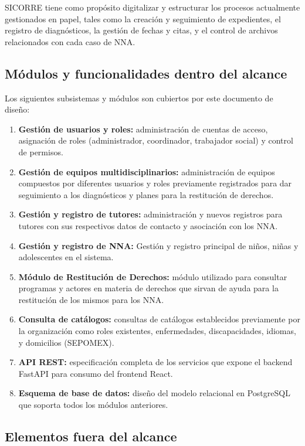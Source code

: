 SICORRE tiene como propósito digitalizar y estructurar los procesos actualmente gestionados
en papel, tales como la creación y seguimiento de expedientes, el registro de diagnósticos,
la gestión de fechas y citas, y el control de archivos relacionados con cada caso de NNA.

\subsection*{Módulos y funcionalidades dentro del alcance}

Los siguientes subsistemas y módulos son cubiertos por este documento de diseño:

\begin{enumerate}
	\item \textbf{Gestión de usuarios y roles:} administración de cuentas de acceso,
	asignación de roles (administrador, coordinador, trabajador social) y control
	de permisos.
	\item \textbf{Gestión de equipos multidisciplinarios:} administración de equipos compuestos
	por diferentes usuarios y roles previamente registrados para dar seguimiento a los diagnósticos y
	planes para la restitución de derechos.
	\item \textbf{Gestión y registro de tutores:} administración y nuevos registros para tutores 
	con sus respectivos datos de contacto y asociación con los NNA.
	\item \textbf{Gestión y registro de NNA:} Gestión y registro principal de niños, niñas y 
	adolescentes en el sistema.
	\item \textbf{Módulo de Restitución de Derechos:} módulo utilizado para consultar programas y actores en 
	materia de derechos que sirvan de ayuda para la restitución de los mismos para los NNA.
	\item \textbf{Consulta de catálogos:} consultas de catálogos establecidos previamente por la organización como 
	roles existentes, enfermedades, discapacidades, idiomas, y domicilios (SEPOMEX). 
	\item \textbf{API REST:} especificación completa de los servicios que expone el
	backend FastAPI para consumo del frontend React.
	\item \textbf{Esquema de base de datos:} diseño del modelo relacional en PostgreSQL
	que soporta todos los módulos anteriores.
\end{enumerate}

\subsection*{Elementos fuera del alcance}

